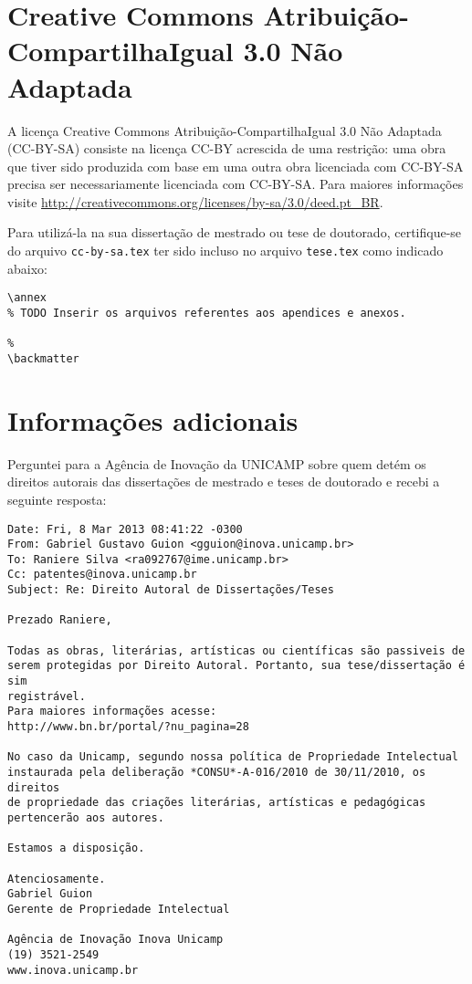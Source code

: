 \section{Creative Commons Atribuição-CompartilhaIgual 3.0 Não Adaptada}
A licença Creative Commons Atribuição-CompartilhaIgual 3.0 Não Adaptada
(CC-BY-SA) consiste na licença CC-BY acrescida de uma restrição: uma obra que
tiver sido produzida com base em uma outra obra licenciada com CC-BY-SA precisa
ser necessariamente licenciada com CC-BY-SA. Para maiores informações visite
\url{http://creativecommons.org/licenses/by-sa/3.0/deed.pt_BR}.

Para utilizá-la na sua dissertação de mestrado ou tese de doutorado,
certifique-se do arquivo \lstinline+cc-by-sa.tex+ ter sido incluso no arquivo
\lstinline+tese.tex+ como indicado abaixo:
\begin{lstlisting}
\annex
% TODO Inserir os arquivos referentes aos apendices e anexos.

%
\backmatter
\end{lstlisting}


\section{Informações adicionais}
Perguntei para a Agência de Inovação da UNICAMP sobre quem detém os direitos
autorais das dissertações de mestrado e teses de doutorado e recebi a seguinte
resposta:

\begin{verbatim}
Date: Fri, 8 Mar 2013 08:41:22 -0300
From: Gabriel Gustavo Guion <gguion@inova.unicamp.br>
To: Raniere Silva <ra092767@ime.unicamp.br>
Cc: patentes@inova.unicamp.br
Subject: Re: Direito Autoral de Dissertações/Teses

Prezado Raniere,

Todas as obras, literárias, artísticas ou científicas são passiveis de
serem protegidas por Direito Autoral. Portanto, sua tese/dissertação é sim
registrável.
Para maiores informações acesse:
http://www.bn.br/portal/?nu_pagina=28

No caso da Unicamp, segundo nossa política de Propriedade Intelectual
instaurada pela deliberação *CONSU*-A-016/2010 de 30/11/2010, os direitos
de propriedade das criações literárias, artísticas e pedagógicas
pertencerão aos autores.

Estamos a disposição.

Atenciosamente.
Gabriel Guion
Gerente de Propriedade Intelectual

Agência de Inovação Inova Unicamp
(19) 3521-2549
www.inova.unicamp.br
\end{verbatim}

